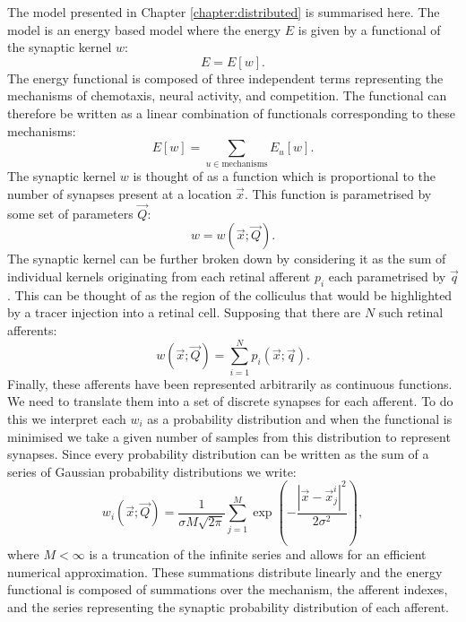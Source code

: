 The model presented in Chapter \ref{chapter:distributed} is summarised here. The model is an energy based model where the energy $E$ is given by a functional of the synaptic kernel $w$:
\begin{equation}
E = E[w].
\end{equation}
The energy functional is composed of three independent terms representing the mechanisms of chemotaxis, neural activity, and competition. The functional can therefore be written as a linear combination of functionals corresponding to these mechanisms:
\begin{equation}
E[w] = \sum_{u \in \text{mechanisms}} E_u[w].
\end{equation}
The synaptic kernel $w$ is thought of as a function which is proportional to the number of synapses present at a location $\vec{x}$. This function is parametrised by some set of parameters $\vec{Q}$:
\begin{equation}
w = w(\vec{x}; \vec{Q}).
\end{equation}
The synaptic kernel can be further broken down by considering it as the sum of individual kernels originating from each retinal afferent $p_i$ each parametrised by $\vec{q}$. This can be thought of as the region of the colliculus that would be highlighted by a tracer injection into a retinal cell. Supposing that there are $N$ such retinal afferents:
\begin{equation}
 w(\vec{x}; \vec{Q}) = \sum_{i=1}^N p_i(\vec{x}; \vec{q}).
\end{equation}
Finally, these afferents have been represented arbitrarily as continuous functions. We need to translate them into a set of discrete synapses for each afferent. To do this we interpret each $w_i$ as a probability distribution and when the functional is minimised we take a given number of samples from this distribution to represent synapses. Since every probability distribution can be written as the sum of a series of Gaussian probability distributions we write:
\begin{equation}
 w_i(\vec{x}; \vec{Q}) = \frac{1}{\sigma M \sqrt{2 \pi}}\sum_{j=1}^{M} \exp\left(-\frac{\left|\vec{x} - \vec{x}^i_j\right|^2}{2\sigma^2}\right),
\end{equation}
where $M < \infty$ is a truncation of the infinite series and allows for an efficient numerical approximation. These summations distribute linearly and the energy functional is composed of summations over the mechanism, the afferent indexes, and the series representing the synaptic probability distribution of each afferent.

